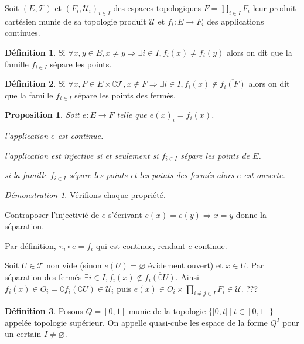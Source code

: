 \documentclass[a4paper, 11pt, french]{book}
\newenvironment{itemise}{\itemize}{\enditemize}
\theoremstyle{plain} %
\newtheorem{proposition}{Proposition}
\theoremstyle{definition} %
\newtheorem{definition}{Définition}
\theoremstyle{remark} %
\newtheorem*{demonstration}{Démonstration}
\newcommand{\1}{\mathds{1}}
\newcommand\vide{\varnothing}
\newcommand{\scr}[1]{\mathscr{#1}}
\newcommand\ens[2]{\{#1 \ |\ #2\}}
\begin{document}
Soit $(E, \scr{T})$ et $(F_i, \scr{U}_i)_{i\in I}$ des espaces topologiques $F=\prod_{i\in I}F_i$ leur produit cartésien munie de sa topologie produit $\scr{U}$ et $f_i:E\rightarrow F_i$ des applications continues.

\begin{definition}
	Si $\forall x, y\in E, x\neq y\Rightarrow\exists i\in I, f_i(x)\neq f_i(y)$ alors on dit que la famille $f_{i\in I}$ sépare les points.
\end{definition}

\begin{definition}
	Si $\forall x, F\in E\times\complement\scr{T}, x\notin F\Rightarrow\exists i\in I, f_i(x)\notin\overline{f_i(F)}$ alors on dit que la famille $f_{i\in I}$ sépare les points des fermés.
\end{definition}

\begin{proposition}
	Soit $e:E\rightarrow F$ telle que $e(x)_i=f_i(x)$.
	\begin{itemise}
		\item l'application $e$ est continue.
		\item l'application est injective si et seulement si $f_{i\in I}$ sépare les points de $E$.
		\item si la famille $f_{i\in I}$ sépare les points et les points des fermés alors $e$ est ouverte.
	\end{itemise}
\end{proposition}

\begin{demonstration}
	Vérifions chaque propriété.
	\begin{itemise}
		\item Contraposer l'injectivié de $e$ s'écrivant $e(x)=e(y)\Rightarrow x=y$ donne la séparation.
		\item Par définition, $\pi_i\circ e=f_i$  qui est continue, rendant $e$ continue.
		\item Soit $U\in\scr{T}$ non vide (sinon $e(U)=\vide$ évidement ouvert) et $x\in U$.
		Par séparation des fermés $\exists i\in I, f_i(x)\notin\overline{f_i(\complement U)}$.
		Ainsi $f_i(x)\in O_i=\complement\overline{f_i(\complement U)}\in\scr{U}_i$ puis $e(x)\in O_i\times\prod_{i\neq j\in I}F_i\in\scr{U}$.
		{\color{red} ???}
	\end{itemise}
\end{demonstration}

\begin{definition}
	Posons $Q=[0, 1]$ munie de la topologie $\ens{[0, t[}{t\in[0, 1]}$ appelée topologie supérieur.
	On appelle quasi-cube les espace de la forme $Q^I$ pour un certain $I\neq\vide$.
\end{definition}
\end{document}
